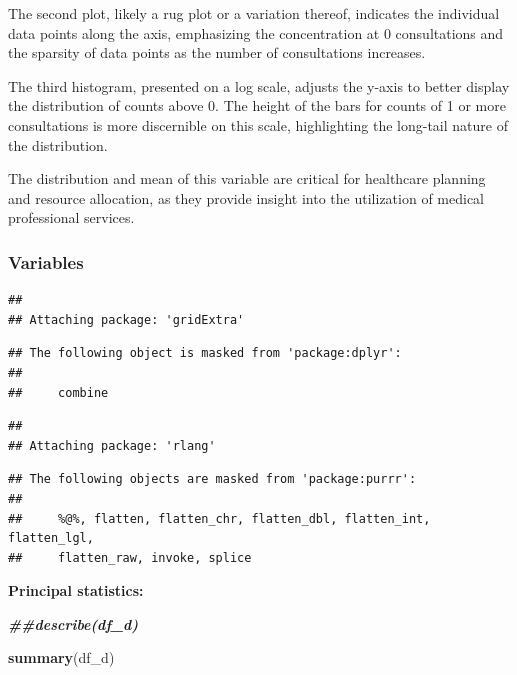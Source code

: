 \documentclass[
]{article}
\newenvironment{Shaded}{\begin{snugshade}}{\end{snugshade}}
\newcommand{\DocumentationTok}[1]{\textcolor[rgb]{0.56,0.35,0.01}{\textbf{\textit{#1}}}}
\newcommand{\FunctionTok}[1]{\textcolor[rgb]{0.13,0.29,0.53}{\textbf{#1}}}
\newcommand{\NormalTok}[1]{#1}
\begin{document}
The second plot, likely a rug plot or a variation thereof, indicates the
individual data points along the axis, emphasizing the concentration at
0 consultations and the sparsity of data points as the number of
consultations increases.

The third histogram, presented on a log scale, adjusts the y-axis to
better display the distribution of counts above 0. The height of the
bars for counts of 1 or more consultations is more discernible on this
scale, highlighting the long-tail nature of the distribution.

The distribution and mean of this variable are critical for healthcare
planning and resource allocation, as they provide insight into the
utilization of medical professional services.

\subsubsection{Variables}\label{variables}

\begin{verbatim}
## 
## Attaching package: 'gridExtra'
\end{verbatim}

\begin{verbatim}
## The following object is masked from 'package:dplyr':
## 
##     combine
\end{verbatim}

\begin{verbatim}
## 
## Attaching package: 'rlang'
\end{verbatim}

\begin{verbatim}
## The following objects are masked from 'package:purrr':
## 
##     %@%, flatten, flatten_chr, flatten_dbl, flatten_int, flatten_lgl,
##     flatten_raw, invoke, splice
\end{verbatim}

\textbf{Principal statistics:}

\begin{Shaded}
\begin{Highlighting}[]
\DocumentationTok{\#\#describe(df\_d)}
\end{Highlighting}
\end{Shaded}

\begin{Shaded}
\begin{Highlighting}[]
\FunctionTok{summary}\NormalTok{(df\_d)}
\end{Highlighting}
\end{Shaded}
\end{document}
